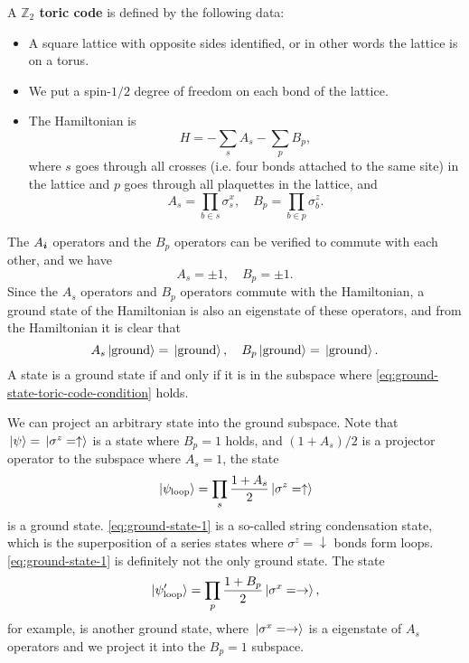 \documentclass[hyperref, a4paper]{article}
\newcommand*{\concept}[1]{{\textbf{#1}}}
\begin{document}
A \concept{$\mathbb{Z}_2$ toric code} is defined by the following data:
\begin{itemize}
    \item A square lattice with opposite sides identified, or in other words the lattice is on a torus.
    \item We put a spin-$1/2$ degree of freedom on each bond of the lattice.
    \item The Hamiltonian is 
    \begin{equation}
        H = - \sum_{s} A_{s} - \sum_{p} B_p,
        \label{eq:toric-code}
    \end{equation}
    where $s$ goes through all crosses (i.e. four bonds attached to the same site) in the lattice and $p$ goes through all plaquettes in the lattice, and 
    \begin{equation}
        A_s = \prod_{b \in s} \sigma^x_s, \quad B_p = \prod_{b \in p} \sigma^z_b.
    \end{equation}
\end{itemize}

The $A_{\vb*{i}}$ operators and the $B_{p}$ operators can be verified to commute with each other, and we have 
\begin{equation}
    A_s = \pm 1, \quad B_p = \pm 1.
\end{equation}
Since the $A_s$ operators and $B_p$ operators commute with the Hamiltonian, 
a ground state of the Hamiltonian is also an eigenstate of these operators, 
and from the Hamiltonian it is clear that 
\begin{equation}
    A_s \ket*{\text{ground}} = \ket*{\text{ground}}, \quad B_p \ket*{\text{ground}} = \ket*{\text{ground}}.
    \label{eq:ground-state-toric-code-condition}
\end{equation}
A state is a ground state if and only if it is in the subspace where \eqref{eq:ground-state-toric-code-condition} holds.

We can project an arbitrary state into the ground subspace. 
Note that $\ket*{\psi} = \ket*{\sigma^z = \uparrow}$ is a state where $B_p = 1$ holds, 
and $(1 + A_s)/{2}$ is a projector operator to the subspace where $A_s = 1$, the state 
\begin{equation}
    \ket*{\psi_\text{loop}} = \prod_s \frac{1 + A_s}{2} \ket*{\sigma^z = \uparrow}
    \label{eq:ground-state-1}
\end{equation}
is a ground state. \eqref{eq:ground-state-1} is a so-called string condensation state, 
which is the superposition of a series states where $\sigma^z = \downarrow$ bonds form loops.
\eqref{eq:ground-state-1} is definitely not the only ground state. 
The state
\begin{equation}
    \ket*{\psi_\text{loop}'} = \prod_p \frac{1 + B_p}{2} \ket*{\sigma^x = \rightarrow},
    \label{eq:ground-state-2}
\end{equation}
for example, is another ground state, 
where $\ket*{\sigma^x = \rightarrow}$ is a eigenstate of $A_s$ operators and we project it into the $B_p = 1$ subspace.
\end{document}
